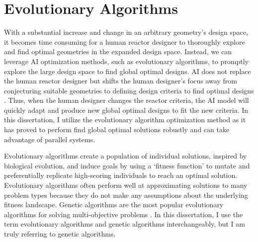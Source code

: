 \section{Evolutionary Algorithms} 
\label{sec:ea}
With a substantial increase and change in an arbitrary geometry's design space, 
it becomes time consuming for a human reactor designer to thoroughly explore 
and find optimal geometries in the expanded design space. 
Instead, we can leverage \gls{AI} optimization methods, such as evolutionary 
algorithms, to promptly explore the large design space to find global optimal 
designs. 
\gls{AI} does not replace the human reactor designer but shifts the human 
designer's focus away from conjecturing suitable geometries to defining design 
criteria to find optimal designs \cite{sobes_artificial_2020}. 
Thus, when the human designer changes the reactor criteria, the \gls{AI} 
model will quickly adapt and produce new global optimal designs to fit the new 
criteria.  
In this dissertation, I utilize the evolutionary algorithm optimization method 
as it has proved to perform find global optimal solutions robustly and can take 
advantage of parallel systems. 

Evolutionary algorithms create a population of individual solutions, inspired 
by biological evolution, and induce goals by using a `fitness function' to 
mutate and preferentially replicate high-scoring individuals to reach an 
optimal solution.
Evolutionary algorithms often perform well at approximating solutions to many 
problem types because they do not make any assumptions about the 
underlying fitness landscape.
Genetic algorithms are the most popular evolutionary algorithms for solving 
multi-objective problems \cite{byrne_evolving_2014, krish_practical_2011}. 
In this dissertation, I use the term evolutionary algorithms and genetic 
algorithms interchangeably, but I am truly referring to genetic algorithms. 

